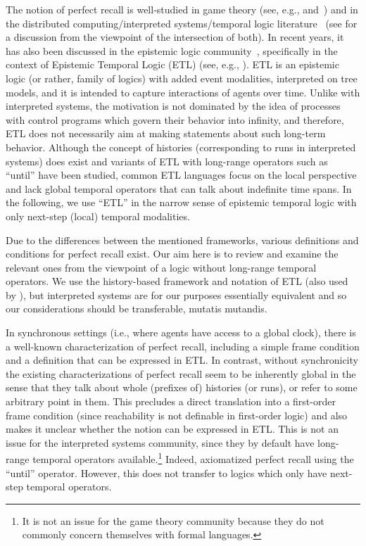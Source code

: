 \documentclass{article}
\newcounter{#1}
\begin{document}
The notion of perfect recall is well-studied in game theory
(see, e.g., \cite{piccione_absent-minded_1997} and~\cite[Section~11.1.3]{osborne_course_1994})
and in the distributed computing/interpreted systems/temporal logic literature~\cite{fagin_reasoning_1995,van_der_meyden_axioms_1993,van_der_meyden_complete_2003,halpern_complete_2004,parikh_knowledge_2003}
(see \cite{halpern_ambiguities_1997} for a discussion from the viewpoint of the intersection of both).
In recent years, it has also been discussed in the epistemic logic community~\cite{van_benthem_games_2001,van_benthem_tree_2006,van_benthem_merging_2009,isaac_synchronizing_2010},
specifically in the context of Epistemic Temporal Logic (ETL) (see, e.g., \cite{van_benthem_tree_2006}).
ETL is an epistemic logic (or rather, family of logics) with added event modalities, interpreted on tree models,
and it is intended to capture interactions of agents over time.
Unlike with interpreted systems, the motivation is not dominated by the idea
of processes with control programs which govern their behavior into infinity,
and therefore, ETL does not necessarily aim at making statements about such long-term behavior.
Although the concept of histories (corresponding to runs in interpreted systems) does exist
and variants of ETL with long-range operators such as ``until'' have been studied,
common ETL languages focus on the local perspective and lack global temporal operators
that can talk about indefinite time spans.
In the following, we use ``ETL'' in the narrow sense of epistemic temporal logic with only next-step (local) temporal modalities.

Due to the differences between the mentioned frameworks,
various definitions and conditions for perfect recall exist.
Our aim here is to review and examine the relevant ones
from the viewpoint of a logic without long-range temporal operators.
We use the history-based framework and notation of ETL (also used by \citet{parikh_knowledge_2003}),
but interpreted systems are for our purposes essentially equivalent \cite{pacuit_comments_2007}
and so our considerations should be transferable, mutatis mutandis.

\medskip

In synchronous settings (i.e., where agents have access to a global clock),
there is a well-known characterization of perfect recall,
including a simple frame condition and a definition that can be expressed in ETL.
In contrast, without synchronicity the existing characterizations of perfect recall
seem to be inherently global in the sense that they talk about whole (prefixes of) histories (or runs),
or refer to some arbitrary point in them.
This precludes a direct translation into a first-order frame condition
(since reachability is not definable in first-order logic)
and also makes it unclear whether the notion can be expressed in ETL.
This is not an issue for the interpreted systems community,
since they by default have long-range temporal operators available.\footnote{It is not an issue for the game theory community because they do not commonly concern themselves with formal languages.}
Indeed, \citet{van_der_meyden_axioms_1993} axiomatized perfect recall using the ``until'' operator.
However, this does not transfer to logics which only have next-step temporal operators.
\end{document}
